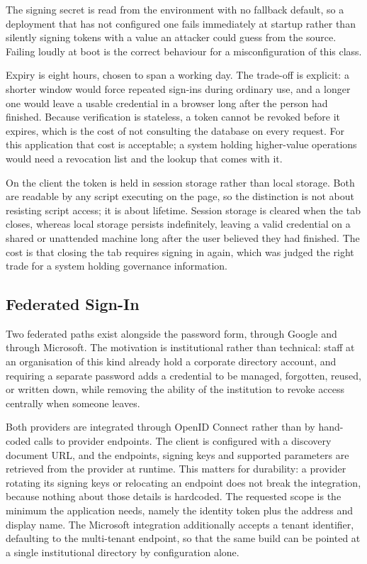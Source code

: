 The signing secret is read from the environment with no fallback default, so a deployment
that has not configured one fails immediately at startup rather than silently signing tokens
with a value an attacker could guess from the source. Failing loudly at boot is the correct
behaviour for a misconfiguration of this class.

Expiry is eight hours, chosen to span a working day. The trade-off is explicit: a shorter
window would force repeated sign-ins during ordinary use, and a longer one would leave a
usable credential in a browser long after the person had finished. Because verification is
stateless, a token cannot be revoked before it expires, which is the cost of not consulting
the database on every request. For this application that cost is acceptable; a system holding
higher-value operations would need a revocation list and the lookup that comes with it.

On the client the token is held in session storage rather than local storage. Both are
readable by any script executing on the page, so the distinction is not about resisting
script access; it is about lifetime. Session storage is cleared when the tab closes, whereas
local storage persists indefinitely, leaving a valid credential on a shared or unattended
machine long after the user believed they had finished. The cost is that closing the tab
requires signing in again, which was judged the right trade for a system holding governance
information.

\subsection{Federated Sign-In}

Two federated paths exist alongside the password form, through Google and through Microsoft.
The motivation is institutional rather than technical: staff at an organisation of this kind
already hold a corporate directory account, and requiring a separate password adds a
credential to be managed, forgotten, reused, or written down, while removing the ability of
the institution to revoke access centrally when someone leaves.

Both providers are integrated through OpenID Connect rather than by hand-coded calls to
provider endpoints. The client is configured with a discovery document URL, and the endpoints,
signing keys and supported parameters are retrieved from the provider at runtime. This matters
for durability: a provider rotating its signing keys or relocating an endpoint does not break
the integration, because nothing about those details is hardcoded. The requested scope is the
minimum the application needs, namely the identity token plus the address and display name.
The Microsoft integration additionally accepts a tenant identifier, defaulting to the
multi-tenant endpoint, so that the same build can be pointed at a single institutional
directory by configuration alone.

